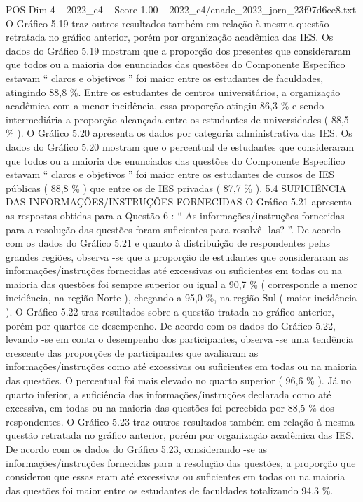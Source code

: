 \begin{textsample}{POS Dim 4 – 2022\_c4 – Score 1.00 – 2022\_c4/enade\_2022\_jorn\_23f97d6ee8.txt}
O Gráfico 5.19 traz outros resultados também em relação à mesma questão retratada no gráfico anterior, porém por organização acadêmica das IES.
Os dados do Gráfico 5.19 mostram que a proporção dos presentes que consideraram que todos ou a maioria dos enunciados das questões do Componente Específico estavam “ claros e objetivos ” foi maior entre os estudantes de faculdades, atingindo 88,8 \%.
Entre os estudantes de centros universitários, a organização acadêmica com a menor incidência, essa proporção atingiu 86,3 \% e sendo intermediária a proporção alcançada entre os estudantes de universidades ( 88,5 \% ).
O Gráfico 5.20 apresenta os dados por categoria administrativa das IES.
Os dados do Gráfico 5.20 mostram que o percentual de estudantes que consideraram que todos ou a maioria dos enunciados das questões do Componente Específico estavam “ claros e objetivos ” foi maior entre os estudantes de cursos de IES públicas ( 88,8 \% ) que entre os de IES privadas ( 87,7 \% ). 5.4 SUFICIÊNCIA DAS INFORMAÇÕES/INSTRUÇÕES FORNECIDAS O Gráfico 5.21 apresenta as respostas obtidas para a Questão 6 : “ As informações/instruções fornecidas para a resolução das questões foram suficientes para resolvê -las? ”.
De acordo com os dados do Gráfico 5.21 e quanto à distribuição de respondentes pelas grandes regiões, observa -se que a proporção de estudantes que consideraram as informações/instruções fornecidas até excessivas ou suficientes em todas ou na maioria das questões foi sempre superior ou igual a 90,7 \% ( corresponde a menor incidência, na região Norte ), chegando a 95,0 \%, na região Sul ( maior incidência ).
O Gráfico 5.22 traz resultados sobre a questão tratada no gráfico anterior, porém por quartos de desempenho.
De acordo com os dados do Gráfico 5.22, levando -se em conta o desempenho dos participantes, observa -se uma tendência crescente das proporções de participantes que avaliaram as informações/instruções como até excessivas ou suficientes em todas ou na maioria das questões.
O percentual foi mais elevado no quarto superior ( 96,6 \% ).
Já no quarto inferior, a suficiência das informações/instruções declarada como até excessiva, em todas ou na maioria das questões foi percebida por 88,5 \% dos respondentes.
O Gráfico 5.23 traz outros resultados também em relação à mesma questão retratada no gráfico anterior, porém por organização acadêmica das IES.
De acordo com os dados do Gráfico 5.23, considerando -se as informações/instruções fornecidas para a resolução das questões, a proporção que considerou que essas eram até excessivas ou suficientes em todas ou na maioria das questões foi maior entre os estudantes de faculdades totalizando 94,3 \%.

\end{textsample}
